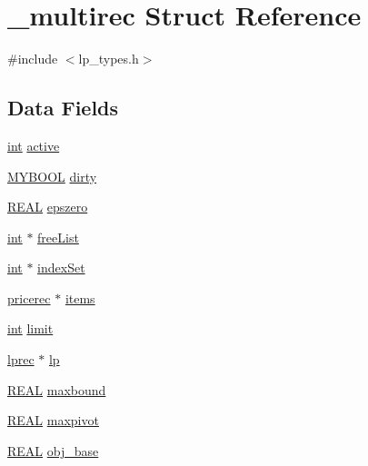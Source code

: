 \hypertarget{struct__multirec}{}\section{\+\_\+multirec Struct Reference}
\label{struct__multirec}


{\ttfamily \#include $<$lp\+\_\+types.\+h$>$}

\subsection*{Data Fields}
\begin{DoxyCompactItemize}
\item 
\hyperlink{lp__lib_8h_adeb9ec6400320e4923ac9d836d509ddb}{int} \hyperlink{struct__multirec_ae7517308809be36ead28ef1e0344e6ce}{active}
\item 
\hyperlink{lp__lib_8h_aad848328fb3018217ac9f01d97b6bd88}{M\+Y\+B\+O\+OL} \hyperlink{struct__multirec_a10aa82eb627980c125be5637e6d81909}{dirty}
\item 
\hyperlink{lp__lib_8h_a92bd5e363d131fa73669358edb232dce}{R\+E\+AL} \hyperlink{struct__multirec_ad9eac7c933d9650f30a78c1f56d692a7}{epszero}
\item 
\hyperlink{lp__lib_8h_adeb9ec6400320e4923ac9d836d509ddb}{int} $\ast$ \hyperlink{struct__multirec_a51d98d75710b080deeb057a58d607e78}{free\+List}
\item 
\hyperlink{lp__lib_8h_adeb9ec6400320e4923ac9d836d509ddb}{int} $\ast$ \hyperlink{struct__multirec_ae1dbe1239dbb119d09612ab44356c7a1}{index\+Set}
\item 
\hyperlink{lp__types_8h_a0742eec2cd7ed1b06c549df43129fbfa}{pricerec} $\ast$ \hyperlink{struct__multirec_aff0c83b73f786b114bcc937644cab277}{items}
\item 
\hyperlink{lp__lib_8h_adeb9ec6400320e4923ac9d836d509ddb}{int} \hyperlink{struct__multirec_a6b7cdb97be3a32a51a0d1a9a2891d1a1}{limit}
\item 
\hyperlink{lp__types_8h_afe42f1373b9ee8d824b5cad6a22d24c6}{lprec} $\ast$ \hyperlink{struct__multirec_a16ff82b89ec00b312cb9a281147b3ebf}{lp}
\item 
\hyperlink{lp__lib_8h_a92bd5e363d131fa73669358edb232dce}{R\+E\+AL} \hyperlink{struct__multirec_a4660175200b0ffac5465f822b6dcdcad}{maxbound}
\item 
\hyperlink{lp__lib_8h_a92bd5e363d131fa73669358edb232dce}{R\+E\+AL} \hyperlink{struct__multirec_a5832ba732df6cd08344d941ed831e445}{maxpivot}
\item 
\hyperlink{lp__lib_8h_a92bd5e363d131fa73669358edb232dce}{R\+E\+AL} \hyperlink{struct__multirec_a045020cc9ed8411f608d8f64714681cd}{obj\+\_\+base}

\end{DoxyCompactItemize}

